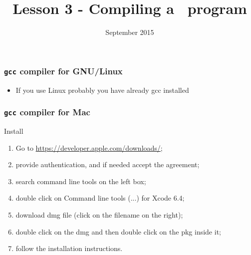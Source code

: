 


\title[Lesson 3]{\textbf{Lesson 3 - Compiling a \C\ program}}
\date[10/9/15]{ September 2015}



\begin{frame}[plain]
  \titlepage
\end{frame}

\begin{frame}
  \frametitle{\texttt{gcc} compiler for GNU/Linux}
  \begin{itemize}
  \item If you use Linux probably you have already gcc installed 
  \end{itemize}
\end{frame}

\begin{frame}
  \frametitle{\texttt{gcc} compiler for Mac}
  \begin{block}{Install}
    \begin{enumerate}
    \item Go to \url{https://developer.apple.com/downloads/};
    \item provide authentication, and if needed accept the agreement;
    \item search \alert{command line tools} on the left box;
    \item double click on \alert{Command line tools (...) for Xcode
        6.4};
    \item download \alert{dmg} file (click on the filename on the right);
    \item double click on the \alert{dmg} and then double
      click on the \alert{pkg} inside it;
    \item follow the installation instructions.
    \end{enumerate}
  \end{block}
\end{frame}

